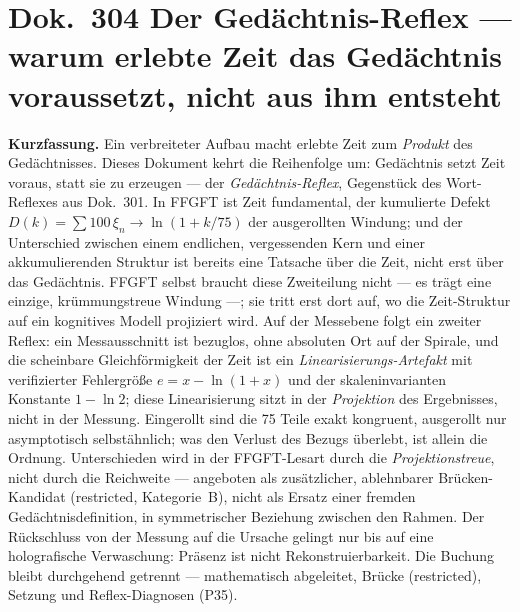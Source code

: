 
\section*{Dok.~304 \quad Der Gedächtnis-Reflex --- warum erlebte Zeit das Gedächtnis
voraussetzt, nicht aus ihm entsteht}

\begingroup\small\noindent
\textbf{Kurzfassung.} Ein verbreiteter Aufbau macht erlebte Zeit zum \emph{Produkt} des Gedächtnisses. Dieses Dokument kehrt die Reihenfolge um: Gedächtnis setzt Zeit voraus, statt sie zu erzeugen --- der \emph{Gedächtnis-Reflex}, Gegenstück des Wort-Reflexes aus Dok.~301. In FFGFT ist Zeit fundamental, der kumulierte Defekt $D(k)=\sum 100\,\xi_n\to\ln(1+k/75)$ der ausgerollten Windung; und der Unterschied zwischen einem endlichen, vergessenden Kern und einer akkumulierenden Struktur ist bereits eine Tatsache über die Zeit, nicht erst über das Gedächtnis. FFGFT selbst braucht diese Zweiteilung nicht --- es trägt eine einzige, krümmungstreue Windung ---; sie tritt erst dort auf, wo die Zeit-Struktur auf ein kognitives Modell projiziert wird. Auf der Messebene folgt ein zweiter Reflex: ein Messausschnitt ist bezuglos, ohne absoluten Ort auf der Spirale, und die scheinbare Gleichförmigkeit der Zeit ist ein \emph{Linearisierungs-Artefakt} mit verifizierter Fehlergröße $e=x-\ln(1+x)$ und der skaleninvarianten Konstante $1-\ln 2$; diese Linearisierung sitzt in der \emph{Projektion} des Ergebnisses, nicht in der Messung. Eingerollt sind die 75 Teile exakt kongruent, ausgerollt nur asymptotisch selbstähnlich; was den Verlust des Bezugs überlebt, ist allein die Ordnung. Unterschieden wird in der FFGFT-Lesart durch die \emph{Projektionstreue}, nicht durch die Reichweite --- angeboten als zusätzlicher, ablehnbarer Brücken-Kandidat (restricted, Kategorie~B), nicht als Ersatz einer fremden Gedächtnisdefinition, in symmetrischer Beziehung zwischen den Rahmen. Der Rückschluss von der Messung auf die Ursache gelingt nur bis auf eine holografische Verwaschung: Präsenz ist nicht Rekonstruierbarkeit. Die Buchung bleibt durchgehend getrennt --- mathematisch abgeleitet, Brücke (restricted), Setzung und Reflex-Diagnosen (P35).
\par\endgroup

\medskip

